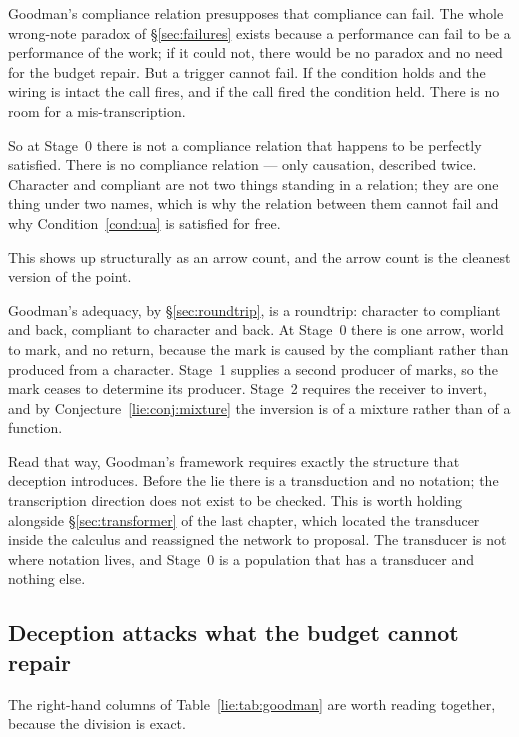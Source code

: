 Goodman's compliance relation presupposes that compliance can fail. The whole
wrong-note paradox of \S\ref{sec:failures} exists because a performance can fail
to be a performance of the work; if it could not, there would be no paradox and
no need for the budget repair. But a trigger cannot fail. If the condition holds
and the wiring is intact the call fires, and if the call fired the condition
held. There is no room for a mis-transcription.

So at Stage~0 there is not a compliance relation that happens to be perfectly
satisfied. There is no compliance relation --- only causation, described twice.
Character and compliant are not two things standing in a relation; they are one
thing under two names, which is why the relation between them cannot fail and
why Condition~\ref{cond:ua} is satisfied for free.

This shows up structurally as an arrow count, and the arrow count is the cleanest
version of the point.

\begin{observation}
\label{lie:obs:roundtrip}
Goodman's adequacy, by \S\ref{sec:roundtrip}, is a roundtrip: character to
compliant and back, compliant to character and back. At Stage~0 there is one
arrow, world to mark, and no return, because the mark is caused by the compliant
rather than produced from a character. Stage~1 supplies a second producer of
marks, so the mark ceases to determine its producer. Stage~2 requires the
receiver to invert, and by Conjecture~\ref{lie:conj:mixture} the inversion is of
a mixture rather than of a function.
\end{observation}

Read that way, Goodman's framework requires exactly the structure that deception
introduces. Before the lie there is a transduction and no notation; the
transcription direction does not exist to be checked. This is worth holding
alongside \S\ref{sec:transformer} of the last chapter, which located the
transducer inside the calculus and reassigned the network to proposal. The
transducer is not where notation lives, and Stage~0 is a population that has a
transducer and nothing else.

\subsection{Deception attacks what the budget cannot repair}
\label{sec:complementary}

The right-hand columns of Table~\ref{lie:tab:goodman} are worth reading
together, because the division is exact.

